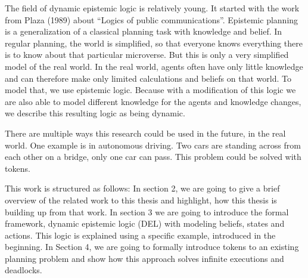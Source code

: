 The field of dynamic epistemic logic is relatively young. It started with the work from Plaza (1989) \cite{plaza1989logics} about ``Logics of public communications''.
Epistemic planning is a generalization of a classical planning task with knowledge and belief. In regular planning, the world is simplified, so that everyone knows everything there is to know about that particular microverse. But this is only a very simplified model of the real world. In the real world, agents often have only little knowledge and can therefore make only limited calculations and beliefs on that world. To model that, we use epistemic logic. Because with a modification of this logic we are also able to model different knowledge for the agents and knowledge changes, we describe this resulting logic as being dynamic.


There are multiple ways this research could be used in the future, in the real world. One example is in autonomous driving. Two cars are standing across from each other on a bridge, only one car can pass. This problem could be solved with tokens.




This work is structured as follows:
In section 2, we are going to give a brief overview of the related work to this thesis and highlight, how this thesis is building up from that work. In section 3 we are going to introduce the formal framework, dynamic epistemic logic (DEL) with modeling beliefs, states and actions. This logic is explained using a specific example, introduced in the beginning. In Section 4, we are going to formally introduce tokens to an existing planning problem and show how this approach solves infinite executions and deadlocks.

